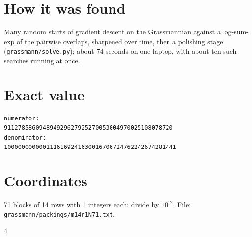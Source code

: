 \documentclass[11pt,a4paper]{article}
\begin{document}
\section{How it was found}
Many random starts of gradient descent on the Grassmannian against a log-sum-exp of the pairwise overlaps, sharpened over time, then a polishing stage (\texttt{grassmann/solve.py}); about 74 seconds on one laptop, with about ten such searches running at once.


\appendix
\section{Exact value}
{\small
\begin{verbatim}
numerator:
911278586094894929627925270053004970025108078720
denominator:
1000000000001116169241630016706724762242674281441
\end{verbatim}}

\section{Coordinates}
71 blocks of 14 rows with 1 integers each; divide by $10^{12}$. File: \texttt{grassmann/packings/m14n1N71.txt}.
{\tiny
\begin{multicols}{4}
\end{multicols}}
\end{document}
